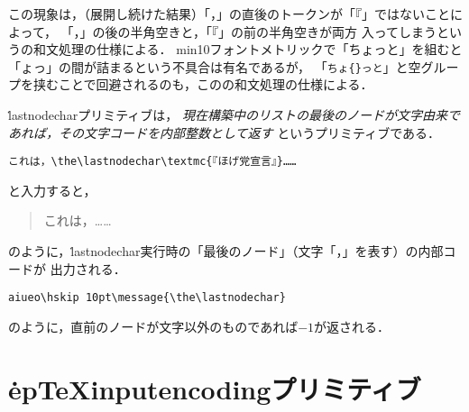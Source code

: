 \documentclass[a4paper,11pt]{jsarticle}
\begin{document}
この現象は，（展開し続けた結果）「，」の直後のトークンが「『」ではないことによって，
「，」の後の半角空きと，「『」の前の半角空きが両方
入ってしまうという\pTeX の和文処理の仕様による．
min10フォントメトリックで「ちょっと」を組むと「ょっ」の間が詰まるという不具合は有名であるが，
「\verb+ちょ{}っと+」と空グループを挟むことで回避されるのも，この\pTeX の和文処理の仕様による．

\medskip
\.{lastnodechar}プリミティブは，
\emph{現在構築中のリストの最後のノードが文字由来であれば，その文字コードを内部整数として返す}
というプリミティブである．
\begin{verbatim}
これは，\the\lastnodechar\textmc{『ほげ党宣言』}……
\end{verbatim}
と入力すると，
\begin{quote}
これは，\the\lastnodechar{}……
\end{quote}
のように，\.{lastnodechar}実行時の「最後のノード」（文字「，」を表す）の内部コードが
出力される．
\begin{verbatim}
aiueo\hskip 10pt\message{\the\lastnodechar}
\end{verbatim}
のように，直前のノードが文字以外のものであれば$-1$が返される．

\section{\.{epTeXinputencoding}プリミティブ}
\end{document}
